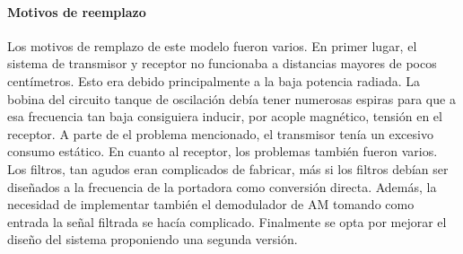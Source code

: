 \paragraph{Motivos de reemplazo}
Los motivos de remplazo de este modelo fueron varios.
En primer lugar, el sistema de transmisor y receptor no funcionaba a distancias mayores de pocos centímetros. Esto era debido principalmente a la baja potencia radiada. La bobina del circuito tanque de oscilación debía tener numerosas espiras para que a esa frecuencia tan baja consiguiera inducir, por acople magnético, tensión en el receptor.
A parte de el problema mencionado, el transmisor tenía un excesivo consumo estático. En cuanto al receptor, los problemas también fueron varios. Los filtros, tan agudos eran complicados de fabricar, más si los filtros debían ser diseñados a la frecuencia de la portadora como conversión directa. Además, la necesidad de implementar también el demodulador de AM tomando como entrada la señal filtrada se hacía complicado.
Finalmente se opta por mejorar el diseño del sistema proponiendo una segunda versión.
